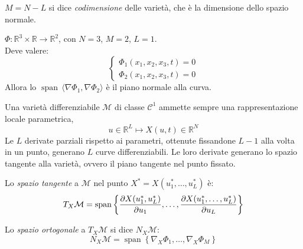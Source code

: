 \begin{definition}
    $M= N-L $ si dice \textit{codimensione} delle varietà, che è la dimensione dello spazio normale.
\end{definition}

\begin{example}
    \(\Phi: \mathbb{R}^3 \times \mathbb{R} \rightarrow \mathbb{R}^2\), con \(N = 3\), \(M = 2\), \(L = 1\).\\
    Deve valere:
    \begin{equation*}
        \begin{cases}
            \Phi_1(x_1,x_2,x_3,t) = 0\\
            \Phi_2(x_1,x_2,x_3,t) = 0
        \end{cases}
    \end{equation*}
    Allora lo $\operatorname{span} \,\langle \nabla \Phi_1, \nabla \Phi_2 \rangle $ è il piano normale alla curva.
\end{example}

\begin{remark}
    Una varietà differenziabile $\mathcal{M}$ di classe $\mathcal{C}^1$ ammette sempre una rappresentazione locale parametrica,
    \begin{equation*}
        u \in \mathbb{R}^L \mapsto X(u, t) \in \mathbb{R}^N
    \end{equation*}
    Le $L$ derivate parziali rispetto ai parametri, ottenute fissandone $L-1$ alla volta in un punto, generano $L$ curve differenziabili. Le loro derivate generano lo spazio tangente alla varietà, ovvero il piano tangente nel punto fissato.
\end{remark}

\begin{definition}
    Lo \textit{spazio tangente} a $\mathcal{M}$ nel punto $X^\ast = X(u_1^\ast,\dots, u_L^\ast)$ è:
    \begin{equation*}
        T_X \mathcal{M} = \operatorname{span} \left\{ \pdv{X(u_1^\ast, u_L^\ast)}{u_1},\dots, \pdv{X(u_1^\ast,\dots, u_L^\ast)}{u_L} \right\}
    \end{equation*}
\end{definition}

\begin{definition}
    Lo \textit{spazio ortogonale} a $T_X \mathcal{M}$ si dice $N_X \mathcal{M}$:
    \begin{equation*}
        N_X \mathcal{M} = \operatorname{span} \left\{ \nabla_X \Phi_1,\dots, \nabla_X \Phi_M  \right\}
    \end{equation*}
\end{definition}

